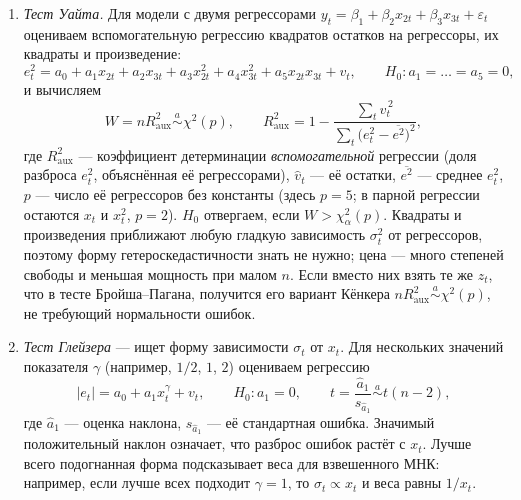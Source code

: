\begin{enumerate}[label=\arabic*), leftmargin=2.2em, itemsep=4pt]
  \item \emph{Тест Уайта.} Для модели с двумя регрессорами
        $y_t = \beta_1 + \beta_2x_{2t} + \beta_3x_{3t} + \varepsilon_t$
        оцениваем вспомогательную регрессию квадратов остатков на регрессоры,
        их квадраты и произведение:
        \[
          e_t^2 = a_0 + a_1x_{2t} + a_2x_{3t} + a_3x_{2t}^2 + a_4x_{3t}^2
                + a_5x_{2t}x_{3t} + v_t ,
          \qquad
          H_0\colon a_1 = \dots = a_5 = 0,
        \]
        и вычисляем
        \begin{equation}
          W = nR^2_{\text{aux}} \overset{a}{\sim} \chi^2(p),
          \qquad
          R^2_{\text{aux}} = 1 - \frac{\sum_t\widehat v_t^{\,2}}
                                      {\sum_t\bigl(e_t^2 - \overline{e^2}\bigr)^2},
          \label{eq:white}
        \end{equation}
        где $R^2_{\text{aux}}$ — коэффициент детерминации
        \emph{вспомогательной} регрессии (доля разброса $e_t^2$, объяснённая
        её регрессорами), $\widehat v_t$ — её остатки, $\overline{e^2}$ —
        среднее $e_t^2$, $p$ — число её регрессоров без константы (здесь
        $p = 5$; в парной регрессии остаются $x_t$ и $x_t^2$, $p = 2$).
        $H_0$ отвергаем, если $W > \chi^2_\alpha(p)$. Квадраты и произведения
        приближают любую гладкую зависимость $\sigma_t^2$ от регрессоров,
        поэтому форму гетероскедастичности знать не нужно; цена — много
        степеней свободы и меньшая мощность при малом $n$. Если вместо них
        взять те же $z_t$, что в тесте Бройша--Пагана, получится его вариант
        Кёнкера $nR^2_{\text{aux}} \overset{a}{\sim} \chi^2(p)$, не требующий
        нормальности ошибок.

  \item \emph{Тест Глейзера} — ищет форму зависимости $\sigma_t$ от $x_t$.
        Для нескольких значений показателя $\gamma$ (например, $1/2$, $1$, $2$)
        оцениваем регрессию
        \[
          |e_t| = a_0 + a_1x_t^{\gamma} + v_t ,
          \qquad
          H_0\colon a_1 = 0,
          \qquad
          t = \frac{\widehat a_1}{s_{\widehat a_1}} \overset{a}{\sim} t(n-2),
        \]
        где $\widehat a_1$ — оценка наклона, $s_{\widehat a_1}$ — её
        стандартная ошибка. Значимый положительный наклон означает, что
        разброс ошибок растёт с $x_t$. Лучше всего подогнанная форма
        подсказывает веса для взвешенного МНК: например, если лучше всех
        подходит $\gamma = 1$, то $\sigma_t \propto x_t$ и веса равны $1/x_t$.


\end{enumerate}
